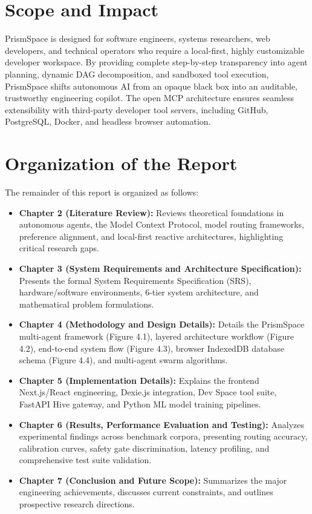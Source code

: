 \documentclass[12pt,a4paper]{report}
\begin{document}
\section{Scope and Impact}
PrismSpace is designed for software engineers, systems researchers, web developers, and technical operators who require a local-first, highly customizable developer workspace. By providing complete step-by-step transparency into agent planning, dynamic DAG decomposition, and sandboxed tool execution, PrismSpace shifts autonomous AI from an opaque black box into an auditable, trustworthy engineering copilot. The open MCP architecture ensures seamless extensibility with third-party developer tool servers, including GitHub, PostgreSQL, Docker, and headless browser automation.

\section{Organization of the Report}
The remainder of this report is organized as follows:
\begin{itemize}
    \item \textbf{Chapter 2 (Literature Review):} Reviews theoretical foundations in autonomous agents, the Model Context Protocol, model routing frameworks, preference alignment, and local-first reactive architectures, highlighting critical research gaps.
    \item \textbf{Chapter 3 (System Requirements and Architecture Specification):} Presents the formal System Requirements Specification (SRS), hardware/software environments, 6-tier system architecture, and mathematical problem formulations.
    \item \textbf{Chapter 4 (Methodology and Design Details):} Details the PrismSpace multi-agent framework (Figure 4.1), layered architecture workflow (Figure 4.2), end-to-end system flow (Figure 4.3), browser IndexedDB database schema (Figure 4.4), and multi-agent swarm algorithms.
    \item \textbf{Chapter 5 (Implementation Details):} Explains the frontend Next.js/React engineering, Dexie.js integration, Dev Space tool suite, FastAPI Hive gateway, and Python ML model training pipelines.
    \item \textbf{Chapter 6 (Results, Performance Evaluation and Testing):} Analyzes experimental findings across benchmark corpora, presenting routing accuracy, calibration curves, safety gate discrimination, latency profiling, and comprehensive test suite validation.
    \item \textbf{Chapter 7 (Conclusion and Future Scope):} Summarizes the major engineering achievements, discusses current constraints, and outlines prospective research directions.
\end{itemize}
\end{document}
